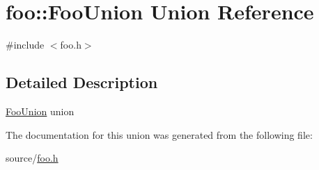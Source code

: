 \hypertarget{unionfoo_1_1FooUnion}{}\section{foo\+:\+:Foo\+Union Union Reference}
\label{unionfoo_1_1FooUnion}


{\ttfamily \#include $<$foo.\+h$>$}



\subsection{Detailed Description}
\hyperlink{unionfoo_1_1FooUnion}{Foo\+Union} union 

The documentation for this union was generated from the following file\+:\begin{DoxyCompactItemize}
\item 
source/\hyperlink{foo_8h}{foo.\+h}\end{DoxyCompactItemize}
